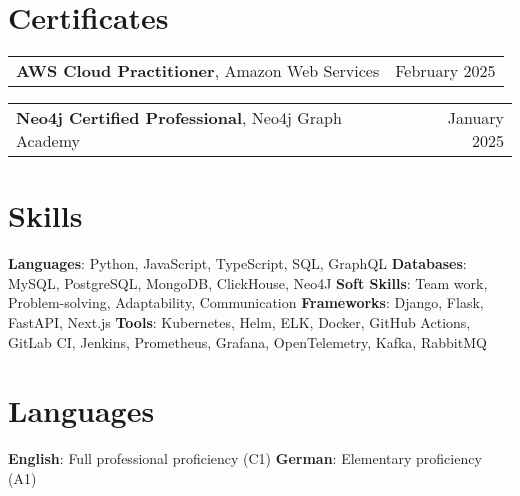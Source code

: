\documentclass[letterpaper,11pt]{article}
\makeatletter
\newcommand{\titleWithDescription}[2]{\textbf{#1}{: #2}}
\newcommand{\resumeLanguages}[4]{
  \section{Languages}
    \noindent
    \titleWithDescription{#1}{#2}
    \hfill
    \titleWithDescription{#3}{#4}
}
\newcommand{\certificateItem}[3]{
  \begin{tabular*}{1\textwidth}{l@{\extracolsep{\fill}}r}
    \small{
      \textbf{#1}{, #2}
    } & \small #3 \\
  \end{tabular*}\vspace{-12px}
}
\makeatother
\begin{document}
\section{Certificates}

    \certificateItem
      {AWS Cloud Practitioner}
      {Amazon Web Services}
      {February 2025}\vspace{3px}

    \certificateItem
      {Neo4j Certified Professional}
      {Neo4j Graph Academy}
      {January 2025}

%
\section{Skills}

  \titleWithDescription{Languages}{Python, JavaScript, TypeScript, SQL, GraphQL}\vspace{3pt}
  \hfill
  \titleWithDescription{Databases}{MySQL, PostgreSQL, MongoDB, ClickHouse, Neo4J}
  \newline
  \titleWithDescription{Soft Skills}{Team work, Problem-solving, Adaptability, Communication}
  \hfill
  \titleWithDescription{Frameworks}{Django, Flask, FastAPI, Next.js}\vspace{3pt}
  \newline
  \titleWithDescription{Tools}{Kubernetes, Helm, ELK, Docker, GitHub Actions, GitLab CI, Jenkins, Prometheus, Grafana, OpenTelemetry, Kafka, RabbitMQ}
\resumeLanguages
  {English}
  {Full professional proficiency (C1)}
  {German}
  {Elementary proficiency (A1)}
\end{document}
